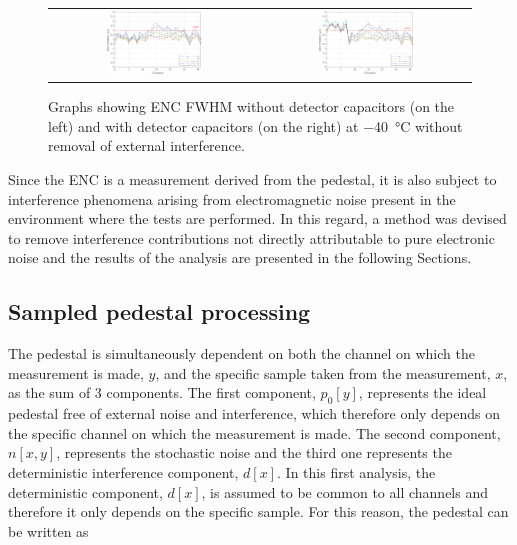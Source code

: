 \begin{figure}[ht]
    \centering
    \begin{tabular}{cc}
         \includegraphics[width=0.475\textwidth]{Images/chap1/results/ENC_minus40C/ASIC_cold_wocaps_normal.pdf} &  \includegraphics[width=0.475\textwidth]{Images/chap1/results/ENC_minus40C/ASIC_cold_wcaps_normal.pdf} \\
    \end{tabular}
    \caption{Graphs showing ENC FWHM without detector capacitors (on the left) and with detector capacitors (on the right) at \SI{-40}{\celsius} without removal of external interference.}
    \label{figENCnormal}
\end{figure}

\par
Since the ENC is a measurement derived from the pedestal, it is also subject to interference phenomena arising from electromagnetic noise present in the environment where the tests are performed. In this regard, a method was devised to remove interference contributions not directly attributable to pure electronic noise and the results of the analysis are presented in the following Sections.

\subsection{Sampled pedestal processing}
The pedestal is simultaneously dependent on both the channel on which the measurement is made, $y$, and the specific sample taken from the measurement, $x$, as the sum of 3 components. The first component, $p_0[y]$, represents the ideal pedestal free of external noise and interference, which therefore only depends on the specific channel on which the measurement is made. The second component, $n[x, y]$, represents the stochastic noise and the third one represents the deterministic interference component, $d[x]$. In this first analysis, the deterministic component, $d[x]$, is assumed to be common to all channels and therefore it only depends on the specific sample. For this reason, the pedestal can be written as

